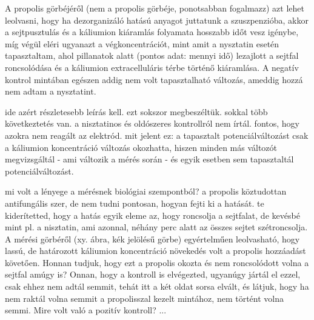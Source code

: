 A propolis görbéjéről (nem a propolis görbéje, ponotsabban fogalmazz) azt lehet leolvasni, hogy ha dezorganizáló hatású anyagot juttatunk a szuszpenzióba, akkor a sejtpusztulás és a káliumion kiáramlás folyamata hosszabb időt vesz igénybe, míg végül eléri ugyanazt a végkoncentrációt, mint amit a nysztatin esetén tapasztaltam, ahol pillanatok alatt (pontos adat: mennyi idő) lezajlott a sejtfal roncsolódása és a káliumion extracelluláris térbe történő kiáramlása. A negatív kontrol mintában egészen addig nem volt tapasztalható változás, ameddig hozzá nem adtam a nysztatint. 


ide azért részletesebb leírás kell. ezt sokszor megbeszéltük. sokkal több következtetés van. a nisztatinos és oldószeres kontrollról nem írtál. fontos, hogy azokra nem reagált az elektród. mit jelent ez: a tapasztalt potenciálváltozást csak a káliumion koncentráció változás okozhatta, hiszen minden más változót megvizsgáltál - ami változik a mérés során - és egyik esetben sem tapasztaltál potenciálváltozást.

mi volt a lényege a mérésnek biológiai szempontból? a propolis köztudottan antifungális szer, de nem tudni pontosan, hogyan fejti ki a hatását. te kiderítetted, hogy a hatás egyik eleme az, hogy roncsolja a sejtfalat, de kevésbé mint pl. a nisztatin, ami azonnal, néhány perc alatt az összes sejtet szétroncsolja. A mérési görbéről (xy. ábra, kék jelölésű görbe) egyértelműen leolvasható, hogy lassú, de határozott káliumion koncentráció növekedés volt a propolis hozzáadást követően. Honnan tudjuk, hogy ezt a propolis okozta és nem roncsolódott volna a sejtfal amúgy is? Onnan, hogy a kontroll is elvégezted, ugyanúgy jártál el ezzel, csak ehhez nem adtál semmit, tehát itt a két oldat sorsa elvált, és látjuk, hogy ha nem raktál volna semmit a propolisszal kezelt mintához, nem történt volna semmi. Mire volt való a pozitív kontroll? ...




